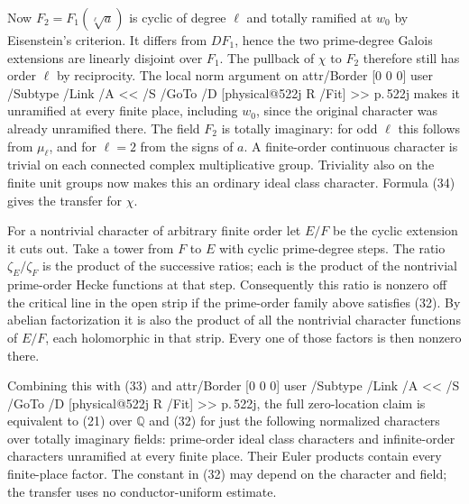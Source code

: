 \documentclass[11pt,letterpaper]{article}
\makeatletter
\newcommand{\Q}{\mathbb Q}
\newcommand{\MusicPDFPageRef}[1]{\pdfpageref\csname physical@#1\endcsname\space\space 0 R}
\newcommand{\pagelink}[2]{\leavevmode\pdfstartlink attr{/Border [0 0 0]} user{%
  /Subtype /Link /A << /S /GoTo /D [\MusicPDFPageRef{#1} /Fit] >>}%
  {\color{ink}#2}\pdfendlink}
\newcommand{\pg}[1]{\pagelink{#1}{p.\,#1}}
\makeatother
\begin{document}
Now $F_2=F_1(\sqrt[\ell]{a})$ is cyclic of degree $\ell$ and totally
ramified at $w_0$ by Eisenstein's criterion. It differs from $DF_1$,
hence the two prime-degree Galois extensions are linearly disjoint
over $F_1$. The pullback of $\chi$ to $F_2$ therefore still has order
$\ell$ by reciprocity. The local norm argument on \pg{522j} makes it
unramified at every finite place, including $w_0$, since the original
character was already unramified there. The field $F_2$ is totally
imaginary: for odd $\ell$ this follows from $\mu_\ell$, and for
$\ell=2$ from the signs of $a$. A finite-order continuous character
is trivial on each connected complex multiplicative group. Triviality
also on the finite unit groups now makes this an ordinary ideal class
character. Formula (34) gives the transfer for $\chi$.

For a nontrivial character of arbitrary finite order let $E/F$ be the
cyclic extension it cuts out. Take a tower from $F$ to $E$ with cyclic
prime-degree steps. The ratio $\zeta_E/\zeta_F$ is the product of the
successive ratios; each is the product of the nontrivial prime-order
Hecke functions at that step. Consequently this ratio is nonzero off
the critical line in the open strip if the prime-order family above
satisfies (32). By abelian factorization it is also the product of
all the nontrivial character functions of $E/F$, each holomorphic
in that strip. Every one of those factors is then nonzero there.

Combining this with (33) and \pg{522j}, the full zero-location claim
is equivalent to (21) over $\Q$ and (32) for just the following
normalized characters over totally imaginary fields: prime-order
ideal class characters and infinite-order characters unramified at
every finite place. Their Euler products contain every finite-place
factor. The constant in (32) may depend on the character and field;
the transfer uses no conductor-uniform estimate.
\end{document}
